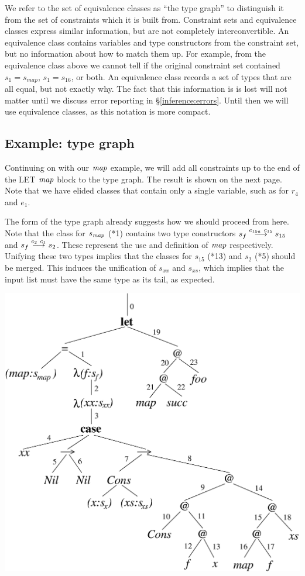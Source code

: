 We refer to the set of equivalence classes as ``the type graph'' to distinguish it from the set of constraints which it is built from. Constraint sets and equivalence classes express similar information, but are not completely interconvertible. An equivalence class contains variables and type constructors from the constraint set, but no information about how to match them up. For example, from the equivalence class above we cannot tell if the original constraint set contained $s_1 = s_{map}$, $s_1 = s_{16}$, or both. An equivalence class records a set of types that are all equal, but not exactly why. The fact that this information is is lost will not matter until we discuss error reporting in \S\ref{inference:errors}. Until then we will use equivalence classes, as this notation is more compact. 

\subsection{Example: type graph}

Continuing on with our $\operatorname{\mathit{map}}$ example, we will add all constraints up to the end of the LET $\operatorname{\mathit{map}}$ block to the type graph. The result is shown on the next page. Note that we have elided classes that contain only a single variable, such as for $r_4$ and $e_1$.

The form of the type graph already suggests how we should proceed from here. Note that the class for $s_{\operatorname{\mathit{map}}}$ (*1) contains two type constructors $s_{f} \stackrel{e_{15a} \ c_{15}}{\longrightarrow} s_{15}$ and $s_f \stackrel{e_2 \ c_1}{\longrightarrow} s_2$. These represent the use and definition of $\operatorname{\mathit{map}}$ respectively. Unifying these two types implies that the  classes for $s_{15}$ (*13) and $s_{2}$ (*5) should be merged. This induces the unification of $s_{xx}$ and $s_{xs}$, which implies that the input list must have the same type as its tail, as expected.
\begin{center}
\includegraphics[scale=0.4]{3-Inference/fig/constraints/example-map}
\end{center}

